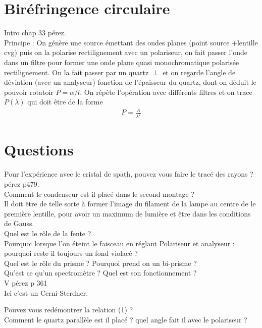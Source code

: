 \documentclass[12pt,prb,aps,epsf]{report}
\begin{document}
\section{Biréfringence circulaire}
Intro chap 33 pérez.\\
Principe :
On génère une source émettant des ondes planes (point source +lentille cvg) puis on la polarise rectilignement avec un polariseur, on fait passer l'onde dans un filtre pour former une onde plane quasi monochromatique polarisée rectilignement. On la fait passer par un quartz $\perp$ et on regarde l'angle de déviation (avec un analyseur) fonction de l'épaisseur du quartz, dont on déduit le pouvoir rotatoir $P=\alpha/l$. On répète l'opération avec différents filtres et on trace $P(\lambda)$ qui doit être de la forme 
\begin{eqnarray}
P = \frac{A}{\lambda^2}
\end{eqnarray}

\section*{Questions}
Pour l'expérience avec le cristal de spath, pouvez vous faire le tracé des rayons ?\\
pérez p479.\\

Comment le condenseur est il placé dans le second montage ?\\
Il doit être de telle sorte à former l'image du filament de la lampe au centre de le première lentille, pour avoir un maximum de lumière et être dans les conditions de Gauss.\\

Quel est le rôle de la fente ?\\

Pourquoi lorsque l'on éteint le faisceau en réglant Polariseur et analyseur : pourquoi reste il toujours un fond violacé ?\\

Quel est le rôle du prisme ? Pourquoi prend on un bi-prisme ?\\

Qu'est ce qu'un spectromètre ? Quel est son fonctionnement ?\\
V pérez p 361\\
Ici c'est un Cerni-Sterdner.

Pouvez vous redémontrer la relation (1) ?\\

Comment le quartz parallèle est il placé ? quel angle fait il avec le polariseur ?\\
\end{document}
